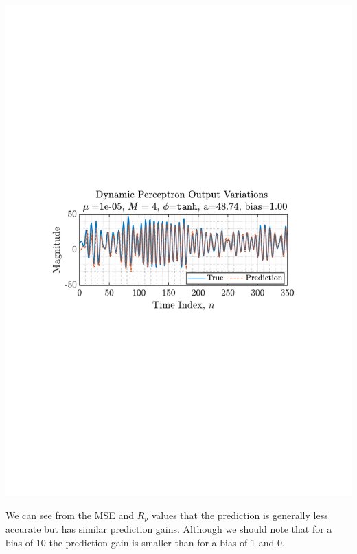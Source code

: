 \documentclass[12pt]{article}
\numberwithin{equation}{section}
\begin{document}
		\begin{minipage}[b]{0.49\textwidth}
			\centering
			\includegraphics[trim={2.2cm 11.2cm 3.15cm  11.2cm}, clip, width=\textwidth]{../MATLAB/figures/q4_4_fig01.pdf} 
			\captionsetup{justification=centering}
			\label{fig: 4-4}
		\end{minipage}%
	
		We can see from the MSE and $R_p$ values that the prediction is generally less accurate but has similar prediction gains. Although we should note that for a bias of 10 the prediction gain is smaller than for a bias of 1 and 0.
\end{document}
